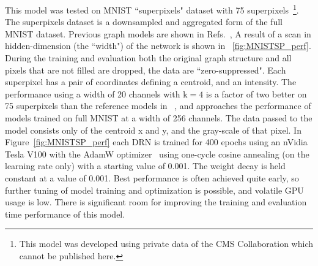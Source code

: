 \documentclass{article}
\begin{document}
This model was tested on MNIST ``superpixels" dataset with 75 superpixels~\footnote{This model was developed using private data of the CMS Collaboration which cannot be published here.}.
The superpixels dataset is a downsampled and aggregated form of the full MNIST dataset.
Previous graph models are shown in Refs.~\cite{monti2016geometric, fey2017splinecnn}, 
A result of a scan in hidden-dimension (the ``width") of the network is shown in ~\ref{fig:MNISTSP_perf}. 
During the training and evaluation both the original graph structure and all pixels that are not filled are dropped, the data are ``zero-suppressed".
Each superpixel has a pair of coordinates defining a centroid, and an intensity.
The performance using a width of 20 channels with $\mathrm{k} = 4$ is a factor of two better on 75 superpixels than the reference models in ~\cite{monti2016geometric, fey2017splinecnn}, and approaches the performance of models trained on full MNIST at a width of 256 channels.
The data passed to the model consists only of the centroid x and y, and the gray-scale of that pixel. 
In Figure~\ref{fig:MNISTSP_perf} each DRN is trained for 400 epochs using an nVidia Tesla V100 with the AdamW optimizer~\cite{loshchilov2017decoupled} using one-cycle cosine annealing (on the learning rate only) with a starting value of 0.001.
The weight decay is held constant at a value of 0.001.
Best performance is often achieved quite early, so further tuning of model training and optimization is possible, and volatile GPU usage is low.
There is significant room for improving the training and evaluation time performance of this model.
\end{document}
